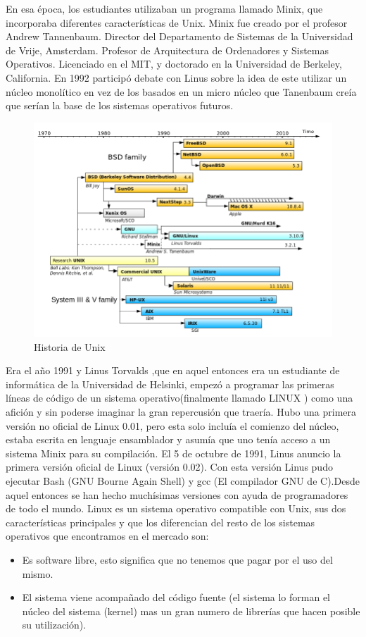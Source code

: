\documentclass[12pt, twoside]{report}
\begin{document}
En esa época, los estudiantes utilizaban un programa llamado Minix, que incorporaba diferentes características de Unix. Minix fue creado por el profesor Andrew Tannenbaum. Director del Departamento de Sistemas de la Universidad de Vrije, Amsterdam.
Profesor de Arquitectura de Ordenadores y Sistemas Operativos. Licenciado en el MIT, y doctorado en la Universidad de Berkeley, California. En 1992 participó debate con Linus sobre la idea de este utilizar un núcleo monolítico en vez de los basados en un micro núcleo que Tanenbaum creía que serían la base de los sistemas operativos futuros.

\begin{figure}
\centering
\includegraphics[width=0.9\linewidth]{Unix_timeline.png}
\caption{Historia de Unix}
\label{fig1001}
\end{figure}

Era el año 1991 y Linus Torvalds ,que en aquel entonces era un estudiante de informática de la Universidad de Helsinki, empezó a programar las primeras líneas de código de un sistema operativo(finalmente llamado LINUX ) como una afición y sin poderse imaginar la gran repercusión que traería.
Hubo una primera versión no oficial de Linux 0.01, pero esta solo incluía el comienzo del núcleo, estaba escrita en lenguaje ensamblador y asumía que uno tenía acceso a un sistema Minix para su compilación.
El 5 de octubre de 1991, Linus anuncio la primera versión oficial de Linux (versión 0.02). Con esta versión Linus pudo ejecutar Bash (GNU Bourne Again Shell) y gcc (El compilador GNU de C).Desde aquel entonces se han hecho muchísimas versiones con ayuda de programadores de todo el mundo.
Linux es un sistema operativo compatible con Unix, sus dos características principales y que los diferencian del resto de los sistemas operativos que encontramos en el mercado son:
\begin{itemize}
	\item Es software libre, esto significa que no tenemos que pagar por el uso del mismo.
	\item El sistema viene acompañado del código fuente (el sistema lo forman el núcleo del sistema (kernel) mas un gran numero de librerías que hacen posible su utilización).
\end{itemize}
\end{document}
